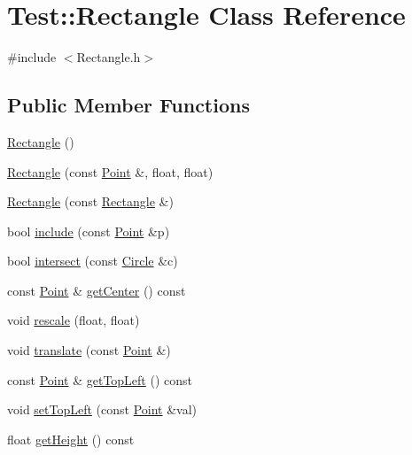 \hypertarget{class_test_1_1_rectangle}{\section{Test\+:\+:Rectangle Class Reference}
\label{class_test_1_1_rectangle}
}


{\ttfamily \#include $<$Rectangle.\+h$>$}

\subsection*{Public Member Functions}
\begin{DoxyCompactItemize}
\item 
\hyperlink{class_test_1_1_rectangle_a994ac32c08c69461433f45c19d749476}{Rectangle} ()
\item 
\hyperlink{class_test_1_1_rectangle_a1eb3bf55af7829367c27e0e0011e2a82}{Rectangle} (const \hyperlink{class_test_1_1_point}{Point} \&, float, float)
\item 
\hyperlink{class_test_1_1_rectangle_a49d36f9a0d94944484351de96d14d5dd}{Rectangle} (const \hyperlink{class_test_1_1_rectangle}{Rectangle} \&)
\item 
bool \hyperlink{class_test_1_1_rectangle_a1d8cd3a9a6fce449b0917a9abb4ced18}{include} (const \hyperlink{class_test_1_1_point}{Point} \&p)
\item 
bool \hyperlink{class_test_1_1_rectangle_a951e1b3dc343bd23d1c2f3c3341997a7}{intersect} (const \hyperlink{class_test_1_1_circle}{Circle} \&c)
\item 
const \hyperlink{class_test_1_1_point}{Point} \& \hyperlink{class_test_1_1_rectangle_a9856a0de354b2ec12691c9d6d92511a5}{get\+Center} () const 
\item 
void \hyperlink{class_test_1_1_rectangle_a283189be2aa33dd9c640221ca9a0640f}{rescale} (float, float)
\item 
void \hyperlink{class_test_1_1_rectangle_ac1d6003b7359ea5b4366de162fc9e160}{translate} (const \hyperlink{class_test_1_1_point}{Point} \&)
\item 
const \hyperlink{class_test_1_1_point}{Point} \& \hyperlink{class_test_1_1_rectangle_a75177622d9abcac4b3814e3493e6e562}{get\+Top\+Left} () const 
\item 
void \hyperlink{class_test_1_1_rectangle_a634c11659765bdd7238f1d17c0be8222}{set\+Top\+Left} (const \hyperlink{class_test_1_1_point}{Point} \&val)
\item 
float \hyperlink{class_test_1_1_rectangle_ab8c2855bb56a33beb5c6061192653b2f}{get\+Height} () const 

\end{DoxyCompactItemize}
